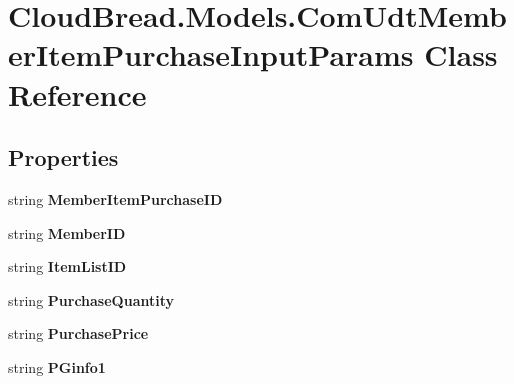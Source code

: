\hypertarget{a00073}{}\section{Cloud\+Bread.\+Models.\+Com\+Udt\+Member\+Item\+Purchase\+Input\+Params Class Reference}
\label{a00073}
\subsection*{Properties}
\begin{DoxyCompactItemize}
\item 
string {\bfseries Member\+Item\+Purchase\+ID}\hypertarget{a00073_a943353068d05e690224036894504daa6}{}\label{a00073_a943353068d05e690224036894504daa6}

\item 
string {\bfseries Member\+ID}\hypertarget{a00073_ae3215d6a99484082969d40f8ebbc1a5d}{}\label{a00073_ae3215d6a99484082969d40f8ebbc1a5d}

\item 
string {\bfseries Item\+List\+ID}\hypertarget{a00073_abb89f9d2bbf6ba778914957102fa7f89}{}\label{a00073_abb89f9d2bbf6ba778914957102fa7f89}

\item 
string {\bfseries Purchase\+Quantity}\hypertarget{a00073_a28a3868dc2f7634ca146f7be9e9b0975}{}\label{a00073_a28a3868dc2f7634ca146f7be9e9b0975}

\item 
string {\bfseries Purchase\+Price}\hypertarget{a00073_a545c4a0df5cf5539637c608fe4b2eeba}{}\label{a00073_a545c4a0df5cf5539637c608fe4b2eeba}

\item 
string {\bfseries P\+Ginfo1}\hypertarget{a00073_a2a8e4a8b41705a90470025652eed398c}{}\label{a00073_a2a8e4a8b41705a90470025652eed398c}


\end{DoxyCompactItemize}
